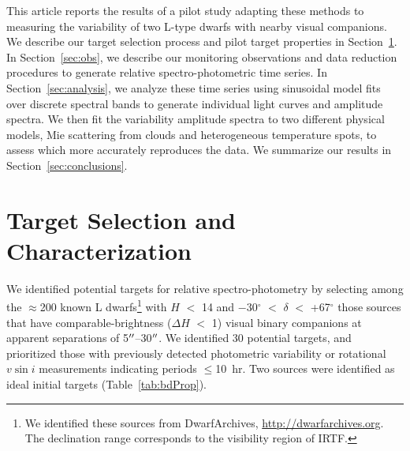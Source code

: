 \documentclass[twocolumn]{aastex6}
\newcommand{\degree}{$^\circ$}
\begin{document}
This article reports the results of a pilot study adapting these methods to measuring the variability of two L-type dwarfs with nearby visual companions. We describe our target selection process and pilot target properties in Section~\ref{sec:targets}.
In Section~\ref{sec:obs}, we describe our monitoring observations and data reduction procedures to generate relative spectro-photometric time series.
In Section~\ref{sec:analysis}, we analyze these time series using sinusoidal model fits over discrete spectral bands to generate individual light curves and amplitude spectra.
We then fit the variability amplitude spectra to two different physical models, Mie scattering from clouds and heterogeneous temperature spots, to assess which more accurately reproduces the data.
We summarize our results in Section~\ref{sec:conclusions}.


\section{Target Selection and Characterization}\label{sec:targets}

We identified potential targets for relative spectro-photometry by selecting among the $\approx$200 known L dwarfs\footnote{We identified these sources from DwarfArchives,  \url{http://dwarfarchives.org}. The declination range corresponds to the visibility region of IRTF.} with $H$ $<$ 14 and $-$30{\degree}  $<$ $\delta$ $<$ +67{\degree} those sources that have comparable-brightness ($\Delta{H}$ $<$ 1) visual binary companions at apparent separations of 5$\mbox{$^{\prime\prime}$}$--30$\mbox{$^{\prime\prime}$}$. We identified 30 potential targets, and prioritized those with previously detected photometric variability or rotational $v\sin{i}$ measurements indicating periods $\leq$10~hr.  Two sources were identified as ideal initial targets (Table~\ref{tab:bdProp}).
\end{document}
